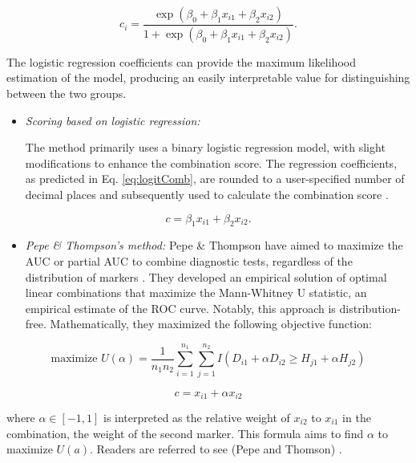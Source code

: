 \begin{equation}
c_i = \frac{\exp(\beta_0 + \beta_1 x_{i1} + \beta_2 x_{i2})}{1 + \exp(\beta_0 + \beta_1 x_{i1} + \beta_2 x_{i2})}.
  \label{eq:logitComb}
\end{equation}

The logistic regression coefficients can provide the maximum likelihood estimation of the model, producing an easily interpretable value for distinguishing between the two groups.

\begin{itemize}
\item
  \emph{Scoring based on logistic regression:}

  The method primarily uses a binary logistic regression model, with slight modifications to enhance the combination score. The regression coefficients, as predicted in Eq. \eqref{eq:logitComb}, are rounded to a user-specified number of decimal places and subsequently used to calculate the combination score \citep{leon2006bedside}.
\end{itemize}

\begin{equation}
c = \beta_1 x_{i1} + \beta_2 x_{i2}.
  \label{eq:linearComb}
\end{equation}

\begin{itemize}
\tightlist
\item
  \emph{Pepe \& Thompson's method:}
  Pepe \& Thompson have aimed to maximize the AUC or partial AUC to combine diagnostic tests, regardless of the distribution of markers \citep{pepe2000combining}. They developed an empirical solution of optimal linear combinations that maximize the Mann-Whitney U statistic, an empirical estimate of the ROC curve. Notably, this approach is distribution-free. Mathematically, they maximized the following objective function:
\end{itemize}

\begin{equation}
\text{maximize } U(\alpha) = \frac{1}{n_1 n_2} \sum_{i=1}^{n_1} \sum_{j=1}^{n_2} I(D_{i1} + \alpha D_{i2} \ge H_{j1} + \alpha H_{j2})
  \label{eq:maxUtility}
\end{equation}

\begin{equation}
c = x_{i1} + \alpha x_{i2}
  \label{eq:alphaCombination}
\end{equation}

where \(\alpha \in [-1,1]\) is interpreted as the relative weight of \(x_{i2}\) to \(x_{i1}\) in the combination, the weight of the second marker. This formula aims to find \(\alpha\) to maximize \(U(a)\). Readers are referred to see (Pepe and Thomson) \citep{pepe2000combining}.

